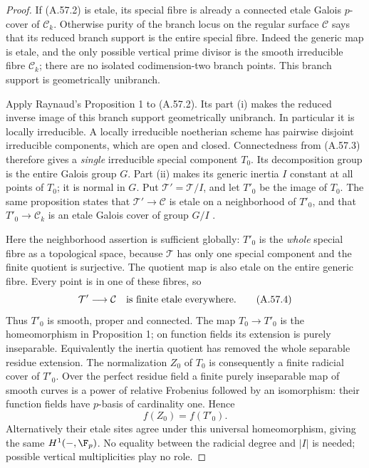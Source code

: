 \begin{proof}
If (A.57.2) is etale, its special fibre is already a connected
etale Galois \(p\)-cover of \(\mathcal C_k\). Otherwise
purity of the branch locus on the regular surface
\(\mathcal C\) says that its reduced branch support is
the entire special fibre. Indeed the generic map is etale,
and the only possible vertical prime divisor is the smooth
irreducible fibre \(\mathcal C_k\); there are no isolated
codimension-two branch points. This branch support is
geometrically unibranch.

Apply Raynaud's Proposition 1 to (A.57.2). Its part (i)
makes the reduced inverse image of this branch support
geometrically unibranch. In particular it is locally
irreducible. A locally irreducible noetherian scheme has
pairwise disjoint irreducible components, which are open
and closed. Connectedness from (A.57.3) therefore gives a
\emph{single} irreducible special component \(T_0\).
Its decomposition group is the entire Galois group \(G\).
Part (ii) makes its generic inertia \(I\) constant at all
points of \(T_0\); it is normal in \(G\). Put
\(\mathcal T'=\mathcal T/I\), and let \(T'_0\) be the
image of \(T_0\). The same proposition states that
\(\mathcal T'\to\mathcal C\) is etale on a neighborhood
of \(T'_0\), and that \(T'_0\to\mathcal C_k\) is an
etale Galois cover of group \(G/I\)
\cite[Proposition 1(i)--(ii), printed pp.179--180]{fghRaynaud1990Pgroups}.

Here the neighborhood assertion is sufficient globally:
\(T'_0\) is the \emph{whole} special fibre as a topological
space, because \(\mathcal T\) has only one special component
and the finite quotient is surjective. The quotient map is
also etale on the entire generic fibre. Every point is in
one of these fibres, so
\[
                  \mathcal T'\longrightarrow\mathcal C
                  \quad\hbox{is finite etale everywhere.}
                                                        \tag{A.57.4}
\]
Thus \(T'_0\) is smooth, proper and connected. The map
\(T_0\to T'_0\) is the homeomorphism in Proposition 1;
on function fields its extension is purely inseparable.
Equivalently the inertia quotient has removed the whole
separable residue extension. The normalization \(Z_0\)
of \(T_0\) is consequently a finite radicial cover of
\(T'_0\). Over the perfect residue field a finite purely
inseparable map of smooth curves is a power of relative
Frobenius followed by an isomorphism: their function fields
have \(p\)-basis of cardinality one. Hence
\[
                            f(Z_0)=f(T'_0).             \tag{A.57.5}
\]
Alternatively their etale sites agree under this universal
homeomorphism, giving the same \(H^1(-,\F_p)\).
No equality between the radicial degree and \(|I|\) is
needed; possible vertical multiplicities play no role.


\end{proof}
